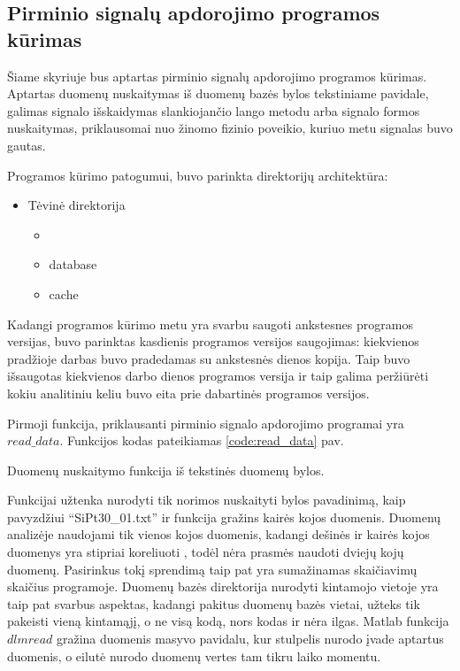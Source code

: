 \documentclass[]{vgtuef}
\begin{document}
\subsection{Pirminio signalų apdorojimo programos kūrimas}

Šiame skyriuje bus aptartas pirminio signalų apdorojimo programos kūrimas. Aptartas duomenų nuskaitymas iš duomenų bazės bylos tekstiniame pavidale, galimas signalo išskaidymas slankiojančio lango metodu arba signalo formos nuskaitymas, priklausomai nuo žinomo fizinio poveikio, kuriuo metu signalas buvo gautas.

Programos kūrimo patogumui, buvo parinkta direktorijų architektūra:

\begin{itemize}
\item Tėvinė direktorija
  \begin{itemize}
  \item <programos versija, nurodyta datos formatu>
  \item database
  \item cache
  \end{itemize}
\end{itemize}

Kadangi programos kūrimo metu yra svarbu saugoti ankstesnes programos versijas, buvo parinktas kasdienis programos versijos saugojimas: kiekvienos pradžioje darbas buvo pradedamas su ankstesnės dienos kopija. Taip buvo išsaugotas kiekvienos darbo dienos programos versija ir taip galima peržiūrėti kokiu analitiniu keliu buvo eita prie dabartinės programos versijos.

Pirmoji funkcija, priklausanti pirminio signalo apdorojimo programai yra $read\_data$. Funkcijos kodas pateikiamas \ref{code:read_data} pav.

\begin{cfigure}
  \centering
  \caption{Duomenų nuskaitymo funkcija iš tekstinės duomenų bylos.}
  \label{code:read_data}
  
\end{cfigure}

Funkcijai užtenka nurodyti tik norimos nuskaityti bylos pavadinimą, kaip pavyzdžiui ``SiPt30\_01.txt'' ir funkcija gražins kairės kojos duomenis. Duomenų analizėje naudojami tik vienos kojos duomenis, kadangi dešinės ir kairės kojos duomenys yra stipriai koreliuoti \cite{16053531}, todėl nėra prasmės naudoti dviejų kojų duomenų. Pasirinkus tokį sprendimą taip pat yra sumažinamas skaičiavimų skaičius programoje. Duomenų bazės direktorija nurodyti kintamojo vietoje yra taip pat svarbus aspektas, kadangi pakitus duomenų bazės vietai, užteks tik pakeisti vieną kintamąjį, o ne visą kodą, nors kodas ir nėra ilgas. Matlab funkcija $dlmread$ gražina duomenis masyvo pavidalu, kur stulpelis nurodo įvade aptartus duomenis, o eilutė nurodo duomenų vertes tam tikru laiko momentu.
\end{document}
